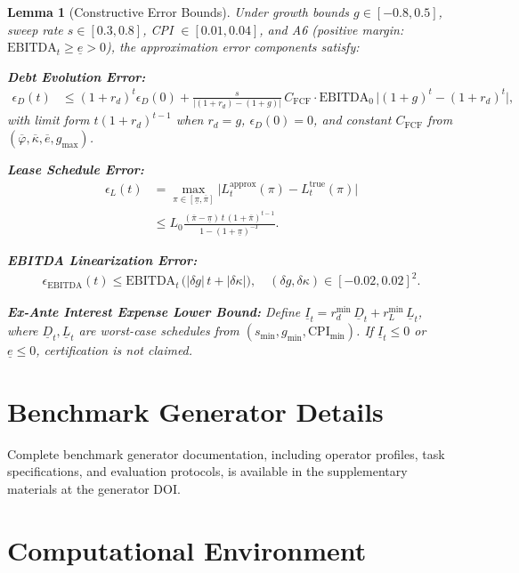 \documentclass[11pt,a4paper]{article}
\numberwithin{equation}{section}
\theoremstyle{plain}
\newtheorem{lemma}{Lemma}
\theoremstyle{definition}
\begin{document}
\begin{lemma}[Constructive Error Bounds]
\label{lem:error_bounds}
Under growth bounds $g \in [-0.8,0.5]$, sweep rate $s \in [0.3,0.8]$, CPI $\in [0.01,0.04]$, and A6 (positive margin: $\text{EBITDA}_t \ge \underline{e} > 0$), the approximation error components satisfy:

\textbf{Debt Evolution Error:}
\begin{align}
\epsilon_D(t) &\le (1+r_d)^t \epsilon_D(0) + \frac{s}{|(1+r_d)-(1+g)|}\, C_{\mathrm{FCF}} \cdot \text{EBITDA}_0 \,\bigl|(1+g)^t - (1+r_d)^t\bigr|,
\end{align}
with limit form $t(1+r_d)^{t-1}$ when $r_d=g$, $\epsilon_D(0)=0$, and constant $C_{\mathrm{FCF}}$ from $(\overline{\varphi},\overline{\kappa},\overline{e},g_{\max})$.

\textbf{Lease Schedule Error:}
\begin{align}
\epsilon_L(t) &= \max_{\pi \in [\underline{\pi},\overline{\pi}]}\bigl|L^{\text{approx}}_t(\pi)-L^{\text{true}}_t(\pi)\bigr| \\
&\le L_0 \frac{(\overline{\pi}-\underline{\pi})\, t\, (1+\overline{\pi})^{t-1}}{1-(1+\underline{\pi})^{-T}}.
\end{align}

\textbf{EBITDA Linearization Error:}
\begin{align}
\epsilon_{\text{EBITDA}}(t) \le \text{EBITDA}_t \,\bigl(|\delta g|\, t + |\delta \kappa|\bigr), \quad (\delta g,\delta \kappa)\in[-0.02,0.02]^2.
\end{align}

\textbf{Ex-Ante Interest Expense Lower Bound:}
Define $\underline{I}_t = r_d^{\min}\,\underline{D}_t + r_L^{\min}\,\underline{L}_t$, where $\underline{D}_t,\underline{L}_t$ are worst-case schedules from $(s_{\min},g_{\min},\text{CPI}_{\min})$. If $\underline{I}_t \le 0$ or $\underline{e}\le 0$, certification is not claimed.
\end{lemma}

\section{Benchmark Generator Details}
\label{app:benchmark}
Complete benchmark generator documentation, including operator profiles, task specifications, and evaluation protocols, is available in the supplementary materials at the generator DOI.

\section{Computational Environment}
\label{app:computation}
\end{document}
